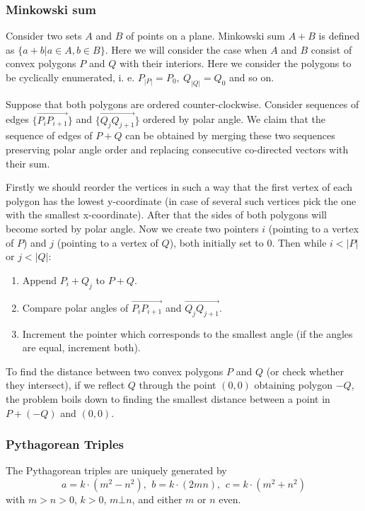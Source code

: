 \subsubsection{Minkowski sum}
Consider two sets $A$ and $B$ of points on a plane. Minkowski sum $A + B$ is defined as $\{a + b| a \in A, b \in B\}$.
Here we will consider the case when $A$ and $B$ consist of convex polygons $P$ and $Q$ with their interiors.
Here we consider the polygons to be cyclically enumerated, i. e. $P_{|P|} = P_0,\ Q_{|Q|} = Q_0$ and so on.

Suppose that both polygons are ordered counter-clockwise. Consider sequences of edges $\{\overrightarrow{P_iP_{i+1}}\}$
and $\{\overrightarrow{Q_jQ_{j+1}}\}$ ordered by polar angle. We claim that the sequence of edges of $P + Q$ can be obtained by merging
these two sequences preserving polar angle order and replacing consecutive co-directed vectors with their sum.

Firstly we should reorder the vertices in such a way that the first vertex
of each polygon has the lowest y-coordinate (in case of several such vertices pick the one with the smallest x-coordinate). After that the sides of both polygons
will become sorted by polar angle.
Now we create two pointers $i$ (pointing to a vertex of $P$) and $j$ (pointing to a vertex of $Q$), both initially set to 0.
Then while $i < |P|$ or $j < |Q|$:
\begin{enumerate}
\item Append $P_i + Q_j$ to $P + Q$.
\item Compare polar angles of $\overrightarrow{P_iP_{i + 1}}$ and $\overrightarrow{Q_jQ_{j+1}}$.
\item Increment the pointer which corresponds to the smallest angle (if the angles are equal, increment both).
\end{enumerate}

To find the distance between two convex polygons $P$ and $Q$ (or check whether they intersect), if we reflect $Q$ through the point $(0, 0)$ obtaining polygon $-Q$, the problem boils down to finding the smallest distance between a point in
$P + (-Q)$ and $(0, 0)$.

\subsubsection{Pythagorean Triples}
 The Pythagorean triples are uniquely generated by $$a=k\cdot (m^{2}-n^{2}),\ \,b=k\cdot (2mn),\ \,c=k\cdot (m^{2}+n^{2})$$
 with $m > n > 0$, $k > 0$, $m \bot n$, and either $m$ or $n$ even.

